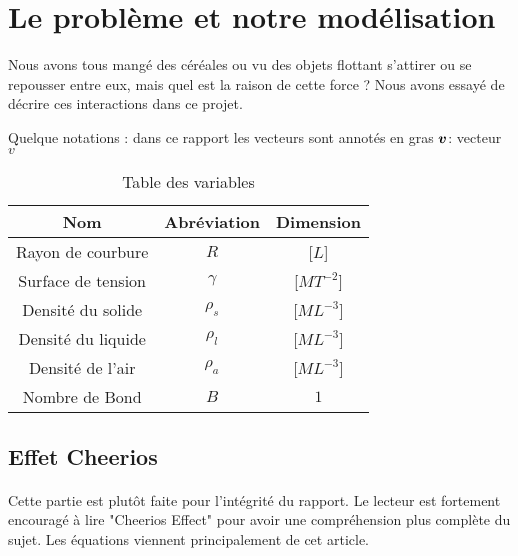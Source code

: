 \section{Le problème et notre modélisation}
    Nous avons tous mangé des céréales ou vu des objets flottant s'attirer ou se repousser entre eux, mais quel est la raison de cette force ? Nous avons essayé de décrire ces interactions dans ce projet.

    Quelque notations : dans ce rapport les vecteurs sont annotés en gras $\vb*{v}$: vecteur $v$
    \begin{table}[H]
        \centering
        \begin{tabular}{ccc}
            \hline
            Nom                & Abréviation & Dimension\\
            \hline
            Rayon de courbure  & $R$         & [$L$]\\
            Surface de tension & $\gamma$    & [$MT^{-2}$]\\ 
            Densité du solide  & $\rho_s$    & [$ML^{-3}$]\\
            Densité du liquide & $\rho_l$    & [$ML^{-3}$]\\
            Densité de l'air   & $\rho_a$    & [$ML^{-3}$]\\
            Nombre de Bond     & $B$         & $1$\\
            \hline
        \end{tabular}
        \caption{Table des variables}
    \end{table}

    \subsection{Effet Cheerios}
        \paragraph*{}{
            Cette partie est plutôt faite pour l'intégrité du rapport. Le lecteur est fortement encouragé à lire "Cheerios Effect"\cite{vella_cheerios_2005} pour avoir une compréhension plus complète du sujet. Les équations viennent principalement de cet article.
        }

